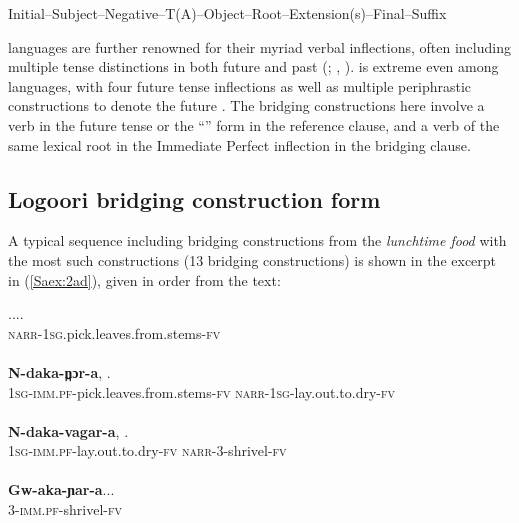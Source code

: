 \documentclass[output=paper]{LSP/langsci}
\begin{document}
\begin{exe}
	\ex	\label{Saex:2}
 {\citep[after][90]{Nurse2003}}
\glt	Initial--Subject--Negative--T(A)--Object--Root--Extension(s)--Final--Suffix
\end{exe}


 languages are further renowned for their myriad verbal inflections, often including multiple tense distinctions in both future and past (\citealt{Botne2008}; \citealt{Nurse2003}, \citealt{Nurse2008}).  is extreme even among  languages, with four future tense inflections as well as multiple periphrastic constructions to denote the future \citep{Sarvasy2016}. The  bridging constructions here involve a verb in the future tense or the ``'' form in the reference clause, and a verb of the same lexical root in the Immediate Perfect inflection in the bridging clause. 
%
\subsection{Logoori bridging construction form}
\label{Sa21form}
A typical sequence including bridging constructions from the  \textit{lunchtime food} \citep{Chesi2014} with the most such constructions (13 bridging constructions) is shown in the excerpt in (\ref{Saex:2ad}), given in order from the text:


\begin{exe}
\ex \label{Saex:2ad}
\begin{xlist}
\ex \label{Saex:2a}
\gll ...\underline{}.\\
\textsc{narr}-\textsc{1sg.}pick.leaves.from.stems\textsc{-fv}\\
\glt {}\\
\ex \label{Saex:2b}
\gll \textbf{N-daka-n̪ɔr-a},          \underline{}.\\
\textsc{1sg}-\textsc{imm.pf-}pick.leaves.from.stems-\textsc{fv}  \textsc{narr}-\textsc{1sg}-lay.out.to.dry-\textsc{fv}\\
\glt {}\\
\ex \label{Saex:2c}
\gll \textbf{N-daka-vagar-a},      \underline{}.\\
\textsc{1sg-imm.pf-}lay.out.to.dry-\textsc{fv}  \textsc{narr}-\textsc{3}-shrivel-\textsc{fv}\\
\glt {}\\
\ex \label{Saex:2d}
\gll \textbf{Gw-aka-ɲar-a}...\\     	       
    \textsc{3}-\textsc{imm.pf-}shrivel-\textsc{fv}\\
\glt {} 
\end{xlist}
\end{exe}
\end{document}

